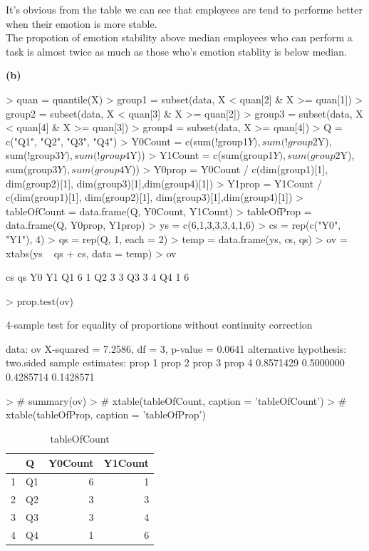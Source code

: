 \documentclass[a4paper]{article}
\renewcommand{\part}[1] {\vspace{.10in} {\bf (#1)}}
\begin{document}
{\color{red}
It's obvious from the table we can see that employees are tend to performe better when their emotion is more stable.\\
The propotion of emotion stability above median employees who can perform a task is almost twice as much as those who's emotion stablity is below median.
}


\part{b}
\begin{Schunk}
\begin{Sinput}
> quan = quantile(X)
> group1 = subset(data, X < quan[2] & X >= quan[1])
> group2 = subset(data, X < quan[3] & X >= quan[2])
> group3 = subset(data, X < quan[4] & X >= quan[3])
> group4 = subset(data, X >= quan[4])
> Q = c("Q1", "Q2", "Q3", "Q4")
> Y0Count = c(sum(!group1$Y), sum(!group2$Y), sum(!group3$Y), sum(!group4$Y))
> Y1Count = c(sum(group1$Y), sum(group2$Y), sum(group3$Y), sum(group4$Y))
> Y0prop = Y0Count / c(dim(group1)[1], dim(group2)[1], dim(group3)[1],dim(group4)[1])
> Y1prop = Y1Count / c(dim(group1)[1], dim(group2)[1], dim(group3)[1],dim(group4)[1])
> tableOfCount = data.frame(Q, Y0Count, Y1Count)
> tableOfProp = data.frame(Q, Y0prop, Y1prop)
> ys = c(6,1,3,3,3,4,1,6)
> cs = rep(c("Y0", "Y1"), 4)
> qs = rep(Q, 1, each = 2)
> temp = data.frame(ys, cs, qs)
> ov = xtabs(ys ~ qs + cs, data = temp)
> ov
\end{Sinput}
\begin{Soutput}
    cs
qs   Y0 Y1
  Q1  6  1
  Q2  3  3
  Q3  3  4
  Q4  1  6
\end{Soutput}
\begin{Sinput}
> prop.test(ov)
\end{Sinput}
\begin{Soutput}
	4-sample test for equality of proportions without continuity
	correction

data:  ov
X-squared = 7.2586, df = 3, p-value = 0.0641
alternative hypothesis: two.sided
sample estimates:
   prop 1    prop 2    prop 3    prop 4 
0.8571429 0.5000000 0.4285714 0.1428571 
\end{Soutput}
\begin{Sinput}
> # summary(ov)
> # xtable(tableOfCount, caption = 'tableOfCount')
> # xtable(tableOfProp, caption = 'tableOfProp')
\end{Sinput}
\end{Schunk}

\begin{table}[ht]
\centering
\begin{tabular}{rlrr}
  \hline
 & Q & Y0Count & Y1Count \\
  \hline
1 & Q1 &   6 &   1 \\
  2 & Q2 &   3 &   3 \\
  3 & Q3 &   3 &   4 \\
  4 & Q4 &   1 &   6 \\
   \hline
\end{tabular}
\caption{tableOfCount}
\end{table}
\end{document}
